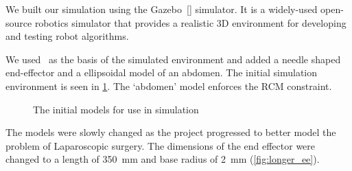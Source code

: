 \documentclass[BTech]{iitmdiss}
\begin{document}
    We built our simulation using the Gazebo~[\cite{gazebo-url}] simulator.
    It is a widely-used open-source robotics simulator that provides a realistic 3D environment for developing and testing robot algorithms.

    We used~\cite{hennersperger2017towards} as the basis of the simulated environment and added a needle shaped end-effector and a ellipsoidal model of an abdomen.
    The initial simulation environment is seen in \ref{fig:initial_simulation_models}.
    The `abdomen' model enforces the RCM constraint.

    \begin{figure}%
        \centering
        \qquad
        \qquad
        \caption{The initial models for use in simulation}
        \label{fig:initial_simulation_models}
    \end{figure}

    The models were slowly changed as the project progressed to better model the problem of Laparoscopic surgery.
    The dimensions of the end effector were changed to a length of \SI{350}{\milli\meter} and base radius of \SI{2}{\milli\meter} (\ref{fig:longer_ee}).
\end{document}
